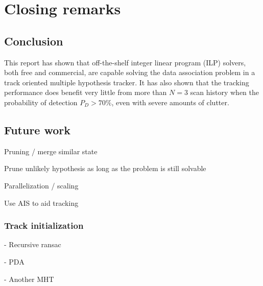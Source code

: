 \section{Closing remarks}
\subsection{Conclusion}
This report has shown that off-the-shelf integer linear program (ILP) solvers, both free and commercial, are capable solving the data association problem in a track oriented multiple hypothesis tracker. It has also shown that the tracking performance does benefit very little from more than $N=3$ scan history when the probability of detection $P_D > 70\%$, even with severe amounts of clutter.

\subsection{Future work}
Pruning / merge similar state

Prune unlikely hypothesis as long as the problem is still solvable

Parallelization / scaling

Use AIS to aid tracking

\subsubsection{Track initialization}
- Recursive ransac

- PDA

- Another MHT